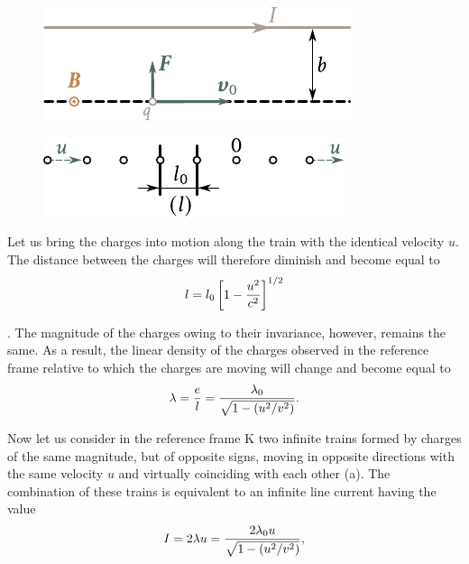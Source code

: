 \begin{figure}[t]
	\begin{minipage}[t]{0.48\linewidth}
		\begin{center}
			\includegraphics[scale=1]{figures/ch_06/fig_6_11.pdf}
			\caption[]{}
			\label{fig:6_11}
		\end{center}
	\end{minipage}
	\hfill{ }%
	\begin{minipage}[t]{0.48\linewidth}
		\begin{center}
			\includegraphics[scale=1]{figures/ch_06/fig_6_12.pdf}
			\caption[]{}
			\label{fig:6_12}
		\end{center}
	\end{minipage}
\vspace{-0.4cm}
\end{figure}

\noindent
Let us bring the charges into motion along the train with the identical velocity $u$. The distance between the charges will therefore diminish and become equal to
\begin{equation*}
    l = l_0 \left[1 - \frac{u^2}{c^2}\right]^{1/2}
\end{equation*}

. The magnitude of the charges owing to their invariance, however, remains the same. As a result, the linear density of the charges observed in the reference frame relative to which the charges are moving will change and become equal to
\begin{equation}\label{eq:6_49}
    \lambda = \frac{e}{l} = \frac{\lambda_0}{\sqrt{1 - \left(u^2/v^2\right)}}.
\end{equation}

Now let us consider in the reference frame K two infinite trains formed by charges of the same magnitude, but of opposite signs, moving in opposite directions with the same velocity $u$ and virtually coinciding with each other (a). The combination of these trains is equivalent to an infinite line current having the value
\begin{equation}\label{eq:6_50}
    I = 2 \lambda u = \frac{2 \lambda_0 u}{\sqrt{1 - \left(u^2/v^2\right)}},
\end{equation}

